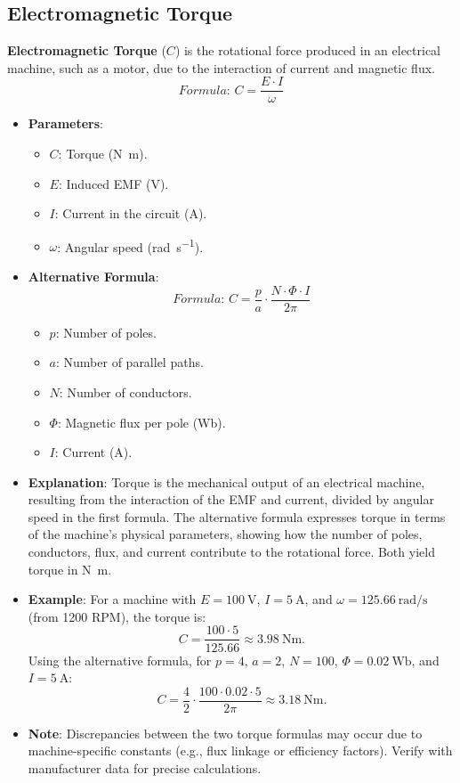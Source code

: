 \documentclass[12pt]{article}
\newcommand{\concept}[1]{\textbf{#1}}
\newcommand{\formula}[1]{\textit{Formula: }#1}
\begin{document}
\subsection{Electromagnetic Torque}
\concept{Electromagnetic Torque} (\(C\)) is the rotational force produced in an electrical machine, such as a motor, due to the interaction of current and magnetic flux.
\[
\formula{C = \frac{E \cdot I}{\omega}}
\]
\begin{itemize}
    \item \textbf{Parameters}:
        \begin{itemize}
            \item \(C\): Torque (\si{\newton\metre}).
            \item \(E\): Induced EMF (\si{\volt}).
            \item \(I\): Current in the circuit (\si{\ampere}).
            \item \(\omega\): Angular speed (\si{\radian\per\second}).
        \end{itemize}
    \item \textbf{Alternative Formula}:
        \[
        \formula{C = \frac{p}{a} \cdot \frac{N \cdot \Phi \cdot I}{2 \pi}}
        \]
        \begin{itemize}
            \item \(p\): Number of poles.
            \item \(a\): Number of parallel paths.
            \item \(N\): Number of conductors.
            \item \(\Phi\): Magnetic flux per pole (\si{\weber}).
            \item \(I\): Current (\si{\ampere}).
        \end{itemize}
    \item \textbf{Explanation}: Torque is the mechanical output of an electrical machine, resulting from the interaction of the EMF and current, divided by angular speed in the first formula. The alternative formula expresses torque in terms of the machine’s physical parameters, showing how the number of poles, conductors, flux, and current contribute to the rotational force. Both yield torque in \si{\newton\metre}.
    \item \textbf{Example}: For a machine with \(E = \SI{100}{\volt}\), \(I = \SI{5}{\ampere}\), and \(\omega = \SI{125.66}{\radian\per\second}\) (from 1200 RPM), the torque is:
        \[
        C = \frac{100 \cdot 5}{125.66} \approx \SI{3.98}{\newton\metre}.
        \]
        Using the alternative formula, for \(p = 4\), \(a = 2\), \(N = 100\), \(\Phi = \SI{0.02}{\weber}\), and \(I = \SI{5}{\ampere}\):
        \[
        C = \frac{4}{2} \cdot \frac{100 \cdot 0.02 \cdot 5}{2 \pi} \approx \SI{3.18}{\newton\metre}.
        \]
        \item \textbf{Note}: Discrepancies between the two torque formulas may occur due to machine-specific constants (e.g., flux linkage or efficiency factors). Verify with manufacturer data for precise calculations.
\end{itemize}
\end{document}
